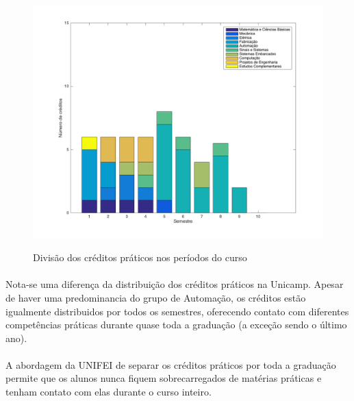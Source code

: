 \documentclass[12pt]{article} %
\begin{document}
\begin{figure}[H]
\centering
\includegraphics[scale=0.3]{pictures/graficoFei.png}\\
\caption{Divisão dos créditos práticos nos períodos do curso}

\end{figure}

\paragraph{} Nota-se uma diferença da distribuição dos créditos práticos na Unicamp. Apesar de haver uma predominancia do grupo de Automação, os créditos estão igualmente distribuidos por todos os semestres, oferecendo contato com diferentes competências práticas durante quase toda a graduação (a exceção sendo o último ano).

\paragraph{} A abordagem da UNIFEI de separar os créditos práticos por toda a graduação permite que os alunos nunca fiquem sobrecarregados de matérias práticas e tenham contato com elas durante o curso inteiro.



\end{document}
